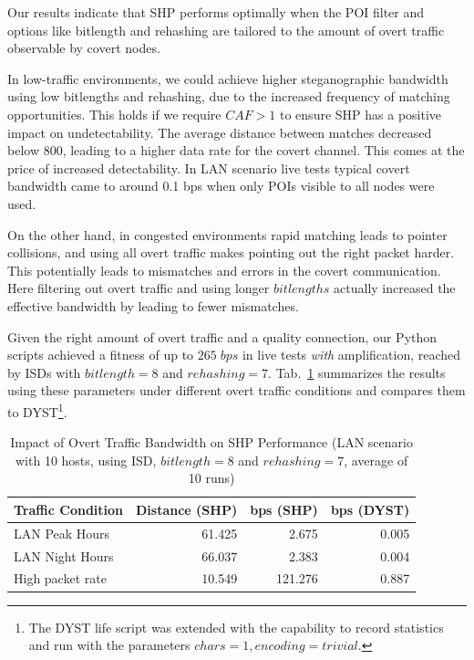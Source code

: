 \documentclass[journal]{IEEEtran}
\begin{document}
Our results indicate that \ac{SHP} performs optimally when the \ac{POI} filter and options like bitlength and rehashing are tailored to the amount of overt traffic observable by covert nodes. 

In low-traffic environments, we could achieve higher steganographic bandwidth using low bitlengths and rehashing, due to the increased frequency of matching opportunities. This holds if we require $CAF > 1$ to ensure \ac{SHP} has a positive impact on undetectability. The average distance between matches decreased below 800, leading to a higher data rate for the covert channel. This comes at the price of increased detectability. In LAN scenario live tests typical covert bandwidth came to around 0.1 bps when only \ac{POI}s visible to all nodes were used. 

On the other hand, in congested environments rapid matching leads to pointer collisions, and using all overt traffic makes pointing out the right packet harder. This potentially leads to mismatches and errors in the covert communication. Here filtering out overt traffic and using longer $bitlengths$ actually increased the effective bandwidth by leading to fewer mismatches.

Given the right amount of overt traffic and a quality connection, our Python scripts achieved a fitness of up to $265\;bps$ in live tests \textit{with} amplification, reached by \ac{ISD}s with $bitlength=8$ and $rehashing=7$. Tab.~\ref{tab:high_low_bandwidth} summarizes the results using these parameters under different overt traffic conditions and compares them to \ac{DYST}\footnote{The \ac{DYST} life script was extended with the capability to record statistics and run with the parameters $chars=1,encoding=trivial$.}.

\begin{table}[h] 
\centering
\caption{Impact of Overt Traffic Bandwidth on \ac{SHP} Performance (LAN scenario with 10 hosts, using ISD, $bitlength=8$ and $rehashing=7$, average of 10 runs)} \label{tab:high_low_bandwidth}
\begin{tabular}{lrr||r}
\toprule
Traffic Condition & Distance (SHP) & bps (SHP) & bps (DYST) \\
\midrule
LAN Peak Hours & 61.425 & 2.675 & 0.005 \\
LAN Night Hours & 66.037 & 2.383 & 0.004 \\
High packet rate & 10.549 & 121.276 & 0.887 \\ 
\bottomrule
\end{tabular}
\end{table}
\end{document}
